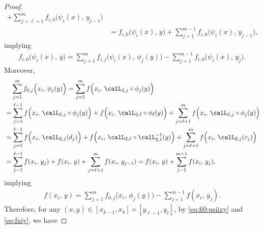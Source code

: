 \documentclass[review,hidelinks,onefignum,onetabnum]{siamart250211}
\begin{document}
\begin{proof}
{\begin{equation*}
\begin{split}
        +
         \sum_{j=\ell+1}^m f_{i,0}\Big(\psi_i(x),\, y_{j-1}\Big)
         \\&=f_{i,0}\Big(\psi_i(x),\, y\Big)
        +
        \sum_{j=1}^{m-1} f_{i,0}\Big(\psi_i(x),\, y_{j-1}\Big),
    \end{split}
\end{equation*}}implying 
\begin{equation}\label{eq:fi0:psiixy}
    \begin{split}
          f_{i,0}\Big(\psi_i(x),\, y\Big)
        =\sum_{j=1}^m f_{i,j}\Big( \psi_i(x), \, \phi_j(y)\Big)-
        \sum_{j=1}^{m-1} f_{i,0}\Big(\psi_i(x),\, y_{j}\Big).
    \end{split}
\end{equation}
Moreover, 
 \begin{equation*}
    \begin{split}
          &\phantom{=\;}\sum_{j=1}^m f_{0,j}\Big( x_i, \, \phi_j(y)\Big)
        = \sum_{j=1}^m f \Big(x_i,\, \calL_{2,j}\circ \phi_j(y)\Big)\\
        &=
        \sum_{j=1}^{\ell-1} f \Big(x_i,\, \calL_{2,j}\circ \phi_j(y)\Big)
        +f \Big(x_i,\, \calL_{2,\ell}\circ \phi_\ell(y)\Big)
        +
         \sum_{j=\ell+1}^mf \Big(x_i,\, \calL_{2,j}\circ \phi_j(y)\Big)
        \\
        &=
        \sum_{j=1}^{\ell-1} f \Big(x_i,\, \calL_{2,j}(d_j)\Big)
        +f \Big(x_i,\, \calL_{2,\ell }\circ \calL_{2,\ell }^{-1}(y)\Big)
        +
        \sum_{j=\ell+1}^m f \Big(x_i,\, \calL_{2,j}(c_j)\Big)
        \\
        &=
        \sum_{j=1}^{\ell-1} f (x_i,\, y_j)
        +f (x_i,\, y)
        +
        \sum_{j=\ell+1}^m f (x_i,\, y_{j-1})        =f (x_i,\, y)
        +
        \sum_{j=1}^{m-1} f (x_i,\, y_{j}),
    \end{split}
\end{equation*}
implying 
\begin{equation}\label{eq:fxiy}
    \begin{split}
          f (x_i,\, y)
        =\sum_{j=1}^m f_{0,j}\Big( x_i, \, \phi_j(y)\Big)-
        \sum_{j=1}^{m-1} f (x_i,\, y_{j}).
    \end{split}
\end{equation}
Therefore, for any $(x,y)\in [x_{k-1}, x_k]\times [y_{\ell-1}, y_\ell]$, by \eqref{eq:fi0:psiixy}  and \eqref{eq:fxiy}, we have

\end{proof}
\end{document}
